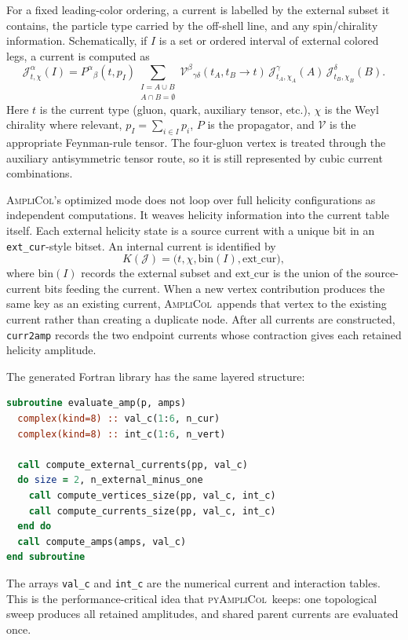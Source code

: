 \documentclass[10pt]{article}
\newcommand{\AC}{\textsc{AmpliCol}}
\newcommand{\PAC}{\textsc{pyAmpliCol}}
\newcommand{\J}{\mathcal{J}}
\newcommand{\V}{\mathcal{V}}
\begin{document}
For a fixed leading-color ordering, a current is labelled by the external
subset it contains, the particle type carried by the off-shell line, and any
spin/chirality information.  Schematically, if $I$ is a set or ordered interval
of external colored legs, a current is computed as
\begin{equation}
  \J^\alpha_{t,\chi}(I)
  =
  P^\alpha{}_\beta(t, p_I)
  \sum_{\substack{I=A\cup B\\A\cap B=\emptyset}}
  \V^\beta{}_{\gamma\delta}(t_A,t_B\to t)\,
  \J^\gamma_{t_A,\chi_A}(A)\,
  \J^\delta_{t_B,\chi_B}(B).
  \label{eq:current-recursion}
\end{equation}
Here $t$ is the current type (gluon, quark, auxiliary tensor, etc.),
$\chi$ is the Weyl chirality where relevant, $p_I=\sum_{i\in I}p_i$, $P$ is
the propagator, and $\V$ is the appropriate Feynman-rule tensor.  The
four-gluon vertex is treated through the auxiliary antisymmetric tensor route,
so it is still represented by cubic current combinations.

\AC's optimized mode does not loop over full helicity configurations as
independent computations.  It weaves helicity information into the current
table itself.  Each external helicity state is a source current with a unique
bit in an \texttt{ext\_cur}-style bitset.  An internal current is identified by
\begin{equation}
  K(\J)=\bigl(t,\chi,\mathrm{bin}(I),\mathrm{ext\_cur}\bigr),
  \label{eq:current-key}
\end{equation}
where $\mathrm{bin}(I)$ records the external subset and $\mathrm{ext\_cur}$ is
the union of the source-current bits feeding the current.  When a new vertex
contribution produces the same key as an existing current, \AC\ appends that
vertex to the existing current rather than creating a duplicate node.  After
all currents are constructed, \texttt{curr2amp} records the two endpoint
currents whose contraction gives each retained helicity amplitude.

The generated Fortran library has the same layered structure:
\begin{lstlisting}[language=Fortran]
subroutine evaluate_amp(p, amps)
  complex(kind=8) :: val_c(1:6, n_cur)
  complex(kind=8) :: int_c(1:6, n_vert)

  call compute_external_currents(pp, val_c)
  do size = 2, n_external_minus_one
    call compute_vertices_size(pp, val_c, int_c)
    call compute_currents_size(pp, val_c, int_c)
  end do
  call compute_amps(amps, val_c)
end subroutine
\end{lstlisting}
The arrays \texttt{val\_c} and \texttt{int\_c} are the numerical current and
interaction tables.  This is the performance-critical idea that \PAC\ keeps:
one topological sweep produces all retained amplitudes, and shared parent
currents are evaluated once.
\end{document}
